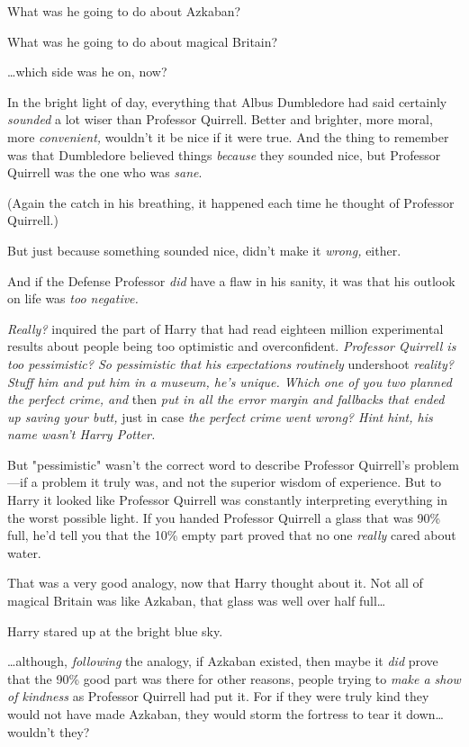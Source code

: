 What was he going to do about Azkaban?

What was he going to do about magical Britain?

{\ldots}which side was he on, now?

In the bright light of day, everything that Albus Dumbledore had said certainly 
\emph{sounded} a lot wiser than Professor Quirrell. Better and brighter, more 
moral, more \emph{convenient,} wouldn't it be nice if it were true. And the 
thing to remember was that Dumbledore believed things \emph{because} they 
sounded nice, but Professor Quirrell was the one who was \emph{sane}.

(Again the catch in his breathing, it happened each time he thought of 
Professor Quirrell.)

But just because something sounded nice, didn't make it \emph{wrong,} either.

And if the Defense Professor \emph{did} have a flaw in his sanity, it was that 
his outlook on life was \emph{too negative.}

\emph{Really?} inquired the part of Harry that had read eighteen million 
experimental results about people being too optimistic and overconfident. 
\emph{Professor Quirrell is too pessimistic? So pessimistic that his 
expectations routinely} undershoot \emph{reality? Stuff him and put him in a 
museum, he's unique. Which one of you two planned the perfect crime, and} 
then \emph{put in all the error margin and fallbacks that ended up saving your 
butt,} just in case \emph{the perfect crime went wrong? Hint hint, his name 
wasn't Harry Potter.}

But "pessimistic" wasn't the correct word to describe Professor Quirrell's 
problem---if a problem it truly was, and not the superior wisdom of experience. 
But to Harry it looked like Professor Quirrell was constantly interpreting 
everything in the worst possible light. If you handed Professor Quirrell a 
glass that was 90\% full, he'd tell you that the 10\% empty part proved that no 
one \emph{really} cared about water.

That was a very good analogy, now that Harry thought about it. Not all of 
magical Britain was like Azkaban, that glass was well over half full{\ldots}

Harry stared up at the bright blue sky.

{\ldots}although, \emph{following} the analogy, if Azkaban existed, then maybe 
it \emph{did} prove that the 90\% good part was there for other reasons, people 
trying to \emph{make a show of kindness} as Professor Quirrell had put it. For 
if they were truly kind they would not have made Azkaban, they would storm the 
fortress to tear it down{\ldots} wouldn't they?

